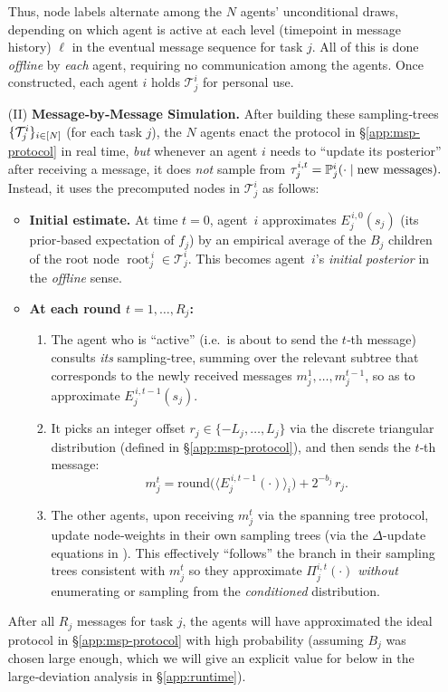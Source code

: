\begin{enumerate}
Thus, node labels alternate among the $N$ agents' unconditional draws,  depending on which agent is active at each level (timepoint in message history) $\ell$ in the eventual message sequence for task $j$. 
All of this is done \emph{offline} by \emph{each} agent, requiring no communication among the agents. 
Once constructed, each agent $i$ holds $\mathcal{T}^i_j$ for personal use.

\item[(II)] \textbf{Message‐by‐Message Simulation.}
After building these sampling‐trees $\{\mathcal{T}^i_j\}_{i\in[N]}$ (for each task $j$), the $N$ agents enact the protocol in \S\ref{app:msp-protocol} in real time, \emph{but} whenever an agent $i$ needs to ``update its posterior'' after receiving a message, it does \emph{not} sample from $\tau^{i,t}_j = \mathbb{P}^i_j(\cdot \mid \text{new messages}).$ 
Instead, it uses the precomputed nodes in $\mathcal{T}^i_j$ as follows:

\begin{itemize}
\item \textbf{Initial estimate.}
  At time $t=0$, agent~$i$ approximates $\displaystyle E^{\,i,0}_j(s_j)$ (its prior‐based expectation of $f_j$) by an empirical average of the $B_j$ children of the root node $\operatorname{root}^{\,i}_j \in \mathcal{T}^i_j$. 
  This becomes agent~$i$'s \emph{initial posterior} 
  in the \emph{offline} sense.

\item \textbf{At each round $t=1,\dots,R_j$:}
  \begin{enumerate}
  \item The agent who is ``active'' (i.e.\ is about to send the $t$‐th message) consults \emph{its} sampling‐tree, summing over the relevant subtree that corresponds to the newly received messages 
    $m_j^1,\dots,m_j^{t-1}$, so as to approximate $E^{\,i,t-1}_j(s_j)$.
  \item It picks an integer offset $r_j\in\{-L_j,\dots,L_j\}$ via the discrete triangular distribution (defined in \S\ref{app:msp-protocol}), and then sends the $t$‐th message:
    \begin{equation*}
       m^t_j = \mathrm{round}\bigl(\langle E^{\,i,t-1}_j(\cdot)\rangle_i\bigr) + 2^{-b_j}\,r_j.
    \end{equation*}
  \item The other agents, upon receiving $m^t_j$ via the spanning tree protocol, update node‐weights in their own sampling trees (via the $\Delta$-update equations in \citep[\S4.2]{aaronson2005complexity}).
  This effectively ``follows'' the branch in their sampling trees consistent with $m^t_j$ so they approximate $\Pi^{i,t}_j(\cdot)$ \emph{without} enumerating or sampling from the \emph{conditioned} distribution.
  \end{enumerate}
\end{itemize}
After all $R_j$ messages for task $j$, the agents will have 
approximated the ideal protocol in \S\ref{app:msp-protocol} with high probability (assuming $B_j$ was chosen large enough, which we will give an explicit value for below in the large‐deviation analysis in \S\ref{app:runtime}).
\end{enumerate}


